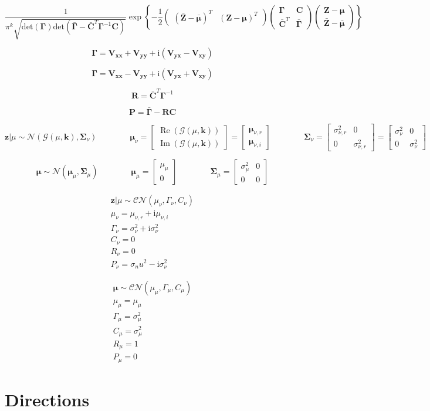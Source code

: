 \documentclass{article}         %
\theoremstyle{definition}
\theoremstyle{remark}
\newcommand{\eq}[1]{\begin{equation} #1 \end{equation}}
\newcommand{\Pbf}{\mathbf{P}}
\newcommand{\Rbf}{\mathbf{R}}
\newcommand{\Zbf}{\mathbf{Z}}
\newcommand{\mubf}{\boldsymbol{\mu}}
\newcommand{\Gammabf}{\mathbf{\Gamma}}
\newcommand{\Cbf}{\mathbf{C}}
\newcommand{\Sigmabf}{\boldsymbol{\Sigma}}
\newcommand{\zcond}{\mathbf{z}|\mu}
\newcommand{\signalG}{\mathcal{G}\paren{\mu,\mathbf{k}}}
\newcommand{\Nscript}{\mathcal{N}}
\newcommand{\CNscript}{\mathcal{CN}}
\newcommand{\im}{\mathrm{i}}
\newcommand{\paren}[1]{\left(#1\right)}
\newcommand{\bracket}[1]{\left[#1\right]}
\newcommand{\arr}[2]{\begin{array}{#1} #2 \end{array}}
\newcommand{\brkarray}[2]{\bracket{\arr{#1}{#2}}}
\newcommand{\reop}[1]{\operatorname{Re}\paren{#1}}
\newcommand{\imop}[1]{\operatorname{Im}\paren{#1}}
\newcommand{\qq}{\qquad\qquad}
\newcommand{\CNpdf}[4]{\frac{1}{\pi^k\sqrt{\mathrm{det}\paren{#3}\mathrm{det}\paren{\bar{#3} - \bar{#4}^T#3^{-1}#4}}} \exp\left\{-\frac{1}{2} \paren{\begin{array}{cc}\paren{\bar{#1} - \bar{#2}}^T & \paren{#1 - #2}^T\end{array}} \paren{\begin{array}{cc} #3 & #4 \\ \bar{#4}^T & \bar{#3} \end{array}}\paren{\begin{array}{c} #1 - #2 \\ \bar{#1} - \bar{#2} \end{array}}\right\}}
\begin{document}
\begin{equation}
	\CNpdf{\Zbf}{\mubf}{\Gammabf}{\Cbf}
\end{equation}

\eq{\Gammabf = \mathbf{V_{xx}} + \mathbf{V_{yy}} + \im\paren{\mathbf{V_{yx}} - \mathbf{V_{xy}}}}

\eq{\Gammabf = \mathbf{V_{xx}} - \mathbf{V_{yy}} + \im\paren{\mathbf{V_{yx}} + \mathbf{V_{xy}}}}

\eq{\Rbf = \bar{\Cbf}^T\Gammabf^{-1}}

\eq{\Pbf = \bar{\Gammabf} - \Rbf\Cbf}

\eq{\zcond \sim \Nscript\paren{\signalG,\Sigmabf_\nu} 
	\qq \mubf_\nu = \bracket{\arr{c}{ \reop{\signalG} \\ \imop{\signalG} }} = \bracket{\arr{c}{ \mubf_{\nu,r} \\ \mubf_{\nu,i} }}
	\qq \Sigmabf_\nu = \brkarray{cc}{ \sigma_{\nu,r}^2 & 0 \\ 0 & \sigma_{\nu,r}^2 } = \brkarray{cc}{ \sigma_\nu^2 & 0 \\ 0 & \sigma_\nu^2 }}

\eq{\mubf \sim \Nscript\paren{\mubf_\mu,\Sigmabf_\mu}
	\qq \mubf_\mu = \brkarray{c}{ \mu_\mu \\ 0 }
	\qq \Sigmabf_\mu = \brkarray{cc}{ \sigma_\mu^2 & 0 \\ 0 & 0 }}

\eq{\arr{c}{ \zcond\sim\CNscript\paren{\mu_\nu,\Gamma_\nu,C_\nu} \\
	\mu_\nu = \mu_{\nu,r} + \im\mu_{\nu,i} \\
	\Gamma_\nu = \sigma_\nu^2 + \im\sigma_\nu^2 \\
	C_\nu = 0 \\
	R_\nu = 0 \\
	P_\nu = \sigma_nu^2 - \im\sigma_\nu^2 }}

\eq{\arr{c}{ \mubf \sim \CNscript\paren{\mu_\mu,\Gamma_\mu,C_\mu} \\
	\mu_\mu = \mu_\mu \\
	\Gamma_\mu = \sigma_\mu^2 \\
	C_\mu = \sigma_\mu^2 \\
	R_\mu = 1 \\
	P_\mu = 0 }}

\section{Directions}\label{Directions}
\end{document}
